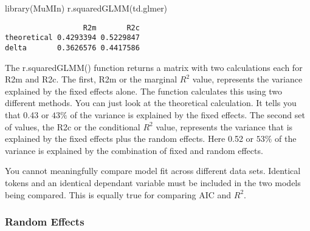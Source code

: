 \documentclass[
  10pt,
  letterpaper]{article}
\newenvironment{Shaded}{\begin{snugshade}}{\end{snugshade}}
\newcommand{\FunctionTok}[1]{\textcolor[rgb]{0.28,0.35,0.67}{#1}}
\newcommand{\NormalTok}[1]{\textcolor[rgb]{0.00,0.23,0.31}{#1}}
\renewcommand\texttt[1]{{\ttfamily\color{BrickRed}#1}}
\begin{document}
\begin{tcolorbox}
\begin{Shaded}
\begin{Highlighting}[]
\FunctionTok{library}\NormalTok{(MuMIn)}
\FunctionTok{r.squaredGLMM}\NormalTok{(td.glmer)}
\end{Highlighting}
\end{Shaded}

\begin{verbatim}
                  R2m       R2c
theoretical 0.4293394 0.5229847
delta       0.3626576 0.4417586
\end{verbatim}

The \texttt{r.squaredGLMM()} function returns a matrix with two
calculations each for \texttt{R2m} and \texttt{R2c}. The first,
\texttt{R2m} or the marginal \(R^2\) value, represents the variance
explained by the fixed effects alone. The function calculates this using
two different methods. You can just look at the \texttt{theoretical}
calculation. It tells you that \texttt{0.43} or \(43\%\) of the variance
is explained by the fixed effects. The second set of values, the
\texttt{R2c} or the conditional \(R^2\) value, represents the variance
that is explained by the fixed effects plus the random effects. Here
\texttt{0.52} or \(53\%\) of the variance is explained by the
combination of fixed and random effects.

\end{tcolorbox}

\begin{tcolorbox}[enhanced jigsaw, colbacktitle=quarto-callout-warning-color!10!white, left=2mm, breakable, opacityback=0, toprule=.15mm, titlerule=0mm, bottomtitle=1mm, colframe=quarto-callout-warning-color-frame, opacitybacktitle=0.6, coltitle=black, leftrule=.75mm, toptitle=1mm, rightrule=.15mm, title=\textcolor{quarto-callout-warning-color}{\faExclamationTriangle}\hspace{0.5em}{Warning}, bottomrule=.15mm, colback=white, arc=.35mm]

You cannot meaningfully compare model fit across different data sets.
Identical tokens and an identical dependant variable must be included in
the two models being compared. This is equally true for comparing AIC
and \(R^2\).

\end{tcolorbox}

\hypertarget{sec-randomeffects}{%
\subsubsection{Random Effects}\label{sec-randomeffects}}
\end{document}
